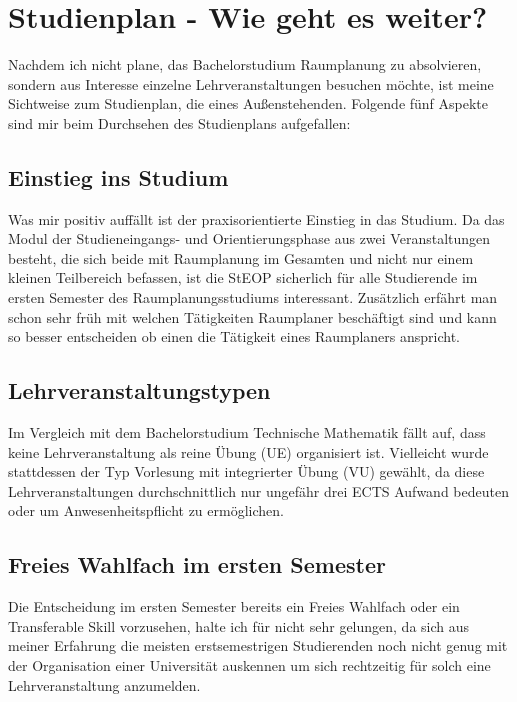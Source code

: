 \documentclass[]{article}
\begin{document}
\section{Studienplan - Wie geht es weiter?}
Nachdem ich nicht plane, das Bachelorstudium Raumplanung zu absolvieren, sondern aus Interesse einzelne Lehrveranstaltungen besuchen möchte, ist meine Sichtweise zum Studienplan, die eines Außenstehenden. Folgende fünf Aspekte sind mir beim Durchsehen des Studienplans aufgefallen:

\subsection{Einstieg ins Studium}
Was mir positiv auffällt ist der praxisorientierte Einstieg in das Studium. Da das Modul der Studieneingangs- und Orientierungsphase aus zwei Veranstaltungen besteht, die sich beide mit Raumplanung im Gesamten und nicht nur einem kleinen Teilbereich befassen, ist die StEOP sicherlich für alle Studierende im ersten Semester des Raumplanungsstudiums interessant. Zusätzlich erfährt man schon sehr früh mit welchen Tätigkeiten Raumplaner beschäftigt sind und kann so besser entscheiden ob einen die Tätigkeit eines Raumplaners anspricht.

\subsection{Lehrveranstaltungstypen}
Im Vergleich mit dem Bachelorstudium Technische Mathematik fällt auf, dass keine Lehrveranstaltung als reine Übung (UE) organisiert ist. Vielleicht wurde stattdessen der Typ Vorlesung mit integrierter Übung (VU) gewählt, da diese Lehrveranstaltungen durchschnittlich nur ungefähr drei ECTS Aufwand bedeuten oder um Anwesenheitspflicht zu ermöglichen.

\subsection{Freies Wahlfach im ersten Semester}
Die Entscheidung im ersten Semester bereits ein Freies Wahlfach oder ein Transferable Skill vorzusehen, halte ich für nicht sehr gelungen, da sich aus meiner Erfahrung die meisten erstsemestrigen Studierenden noch nicht genug mit der Organisation einer Universität auskennen um sich rechtzeitig für solch eine Lehrveranstaltung anzumelden.
\end{document}
